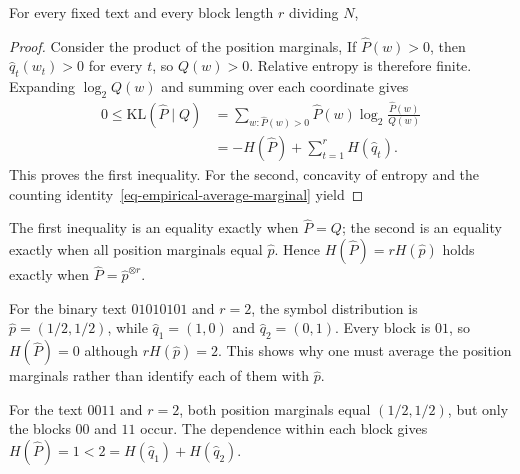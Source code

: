 \begin{prop}\label{prop-empirical-block-entropy}
For every fixed text and every block length $r$ dividing $N$,
\end{prop}

\begin{proof}
Consider the product of the position marginals,
If $\hat P(w)>0$, then $\hat q_t(w_t)>0$ for every $t$, so $Q(w)>0$. Relative entropy is therefore finite. Expanding $\log_2 Q(w)$ and summing over each coordinate gives
\begin{align*}
 0\leq\mathrm{KL}(\hat P\mid Q)
 &=\sum_{w:\hat P(w)>0}\hat P(w)\log_2\frac{\hat P(w)}{Q(w)}\\
 &=-H(\hat P)+\sum_{t=1}^rH(\hat q_t).
\end{align*}
This proves the first inequality. For the second, concavity of entropy and the counting identity~\eqref{eq-empirical-average-marginal} yield
\end{proof}

The first inequality is an equality exactly when $\hat P=Q$; the second is an equality exactly when all position marginals equal $\hat p$. Hence $H(\hat P)=rH(\hat p)$ holds exactly when $\hat P=\hat p^{\otimes r}$.

\begin{exmp}
For the binary text $01010101$ and $r=2$, the symbol distribution is $\hat p=(1/2,1/2)$, while $\hat q_1=(1,0)$ and $\hat q_2=(0,1)$. Every block is $01$, so $H(\hat P)=0$ although $rH(\hat p)=2$. This shows why one must average the position marginals rather than identify each of them with $\hat p$.

For the text $0011$ and $r=2$, both position marginals equal $(1/2,1/2)$, but only the blocks $00$ and $11$ occur. The dependence within each block gives $H(\hat P)=1<2=H(\hat q_1)+H(\hat q_2)$.
\end{exmp}

